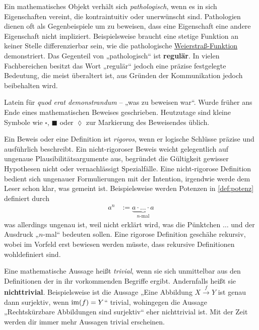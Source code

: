 \begin{description}[labelindent=0pt, leftmargin=0pt]
    \item[Pathologisch:] Ein mathematisches Objekt verhält sich \emph{pathologisch}, wenn es in sich Eigenschaften vereint, die kontraintuitiv oder unerwünscht sind. Pathologien dienen oft als Gegenbeispiele um zu beweisen, dass eine Eigenschaft eine andere Eigenschaft nicht impliziert. Beispielsweise braucht eine stetige Funktion an keiner Stelle differenzierbar sein, wie die pathologische \href{https://de.wikipedia.org/wiki/Weierstrass-Funktion}{Weierstraß-Funktion} demonstriert. Das Gegenteil von „pathologisch“ ist \textbf{regulär}. In vielen Fachbereichen besitzt das Wort „regulär“ jedoch eine präzise festgelegte Bedeutung, die meist überaltert ist, aus Gründen der Kommunikation jedoch beibehalten wird.

    \item[QED:] Latein für \emph{quod erat demonstrandum} -- „was zu beweisen war“. Wurde früher ans Ende eines mathematischen Beweises geschrieben. Heutzutage sind kleine Symbole wie $\square$, $\blacksquare$ oder $\lozenge$ zur Markierung des Beweisendes üblich.
    
    \item[Rigoros:] Ein Beweis oder eine Definition ist \emph{rigoros}, wenn er logische Schlüsse präzise und ausführlich beschreibt. Ein nicht-rigoroser Beweis weicht gelegentlich auf ungenaue Plausibilitätsargumente aus, begründet die Gültigkeit gewisser Hypothesen nicht oder vernachlässigt Spezialfälle. Eine nicht-rigorose Definition bedient sich ungenauer Formulierungen mit der Intention, irgendwie werde dem Leser schon klar, was gemeint ist. Beispielsweise werden Potenzen in \cref{def:potenz} definiert durch
    \begin{align*}
        a^n & := \underbrace{a \cdot \ldots \cdot a}_{n\text{-mal}}
    \end{align*}
    was allerdings ungenau ist, weil nicht erklärt wird, was die Pünktchen $\dots$ und der Ausdruck „$n$-mal“ bedeuten sollen. Eine rigorose Definition geschähe rekursiv, wobei im Vorfeld erst bewiesen werden müsste, dass rekursive Definitionen wohldefiniert sind.

    \item[Trivial:] Eine mathematische Aussage heißt \emph{trivial}, wenn sie sich unmittelbar aus den Definitionen der in ihr vorkommenden Begriffe ergibt. Andernfalls heißt sie \textbf{nichttrivial}. Beispielsweise ist die Aussage „Eine Abbildung $X\xrightarrow{f} Y$ ist genau dann surjektiv, wenn $\operatorname{im}(f)=Y$“ trivial, wohingegen die Aussage „Rechtskürzbare Abbildungen sind surjektiv“ eher nichttrivial ist. Mit der Zeit werden dir immer mehr Aussagen trivial erscheinen.
    

\end{description}
